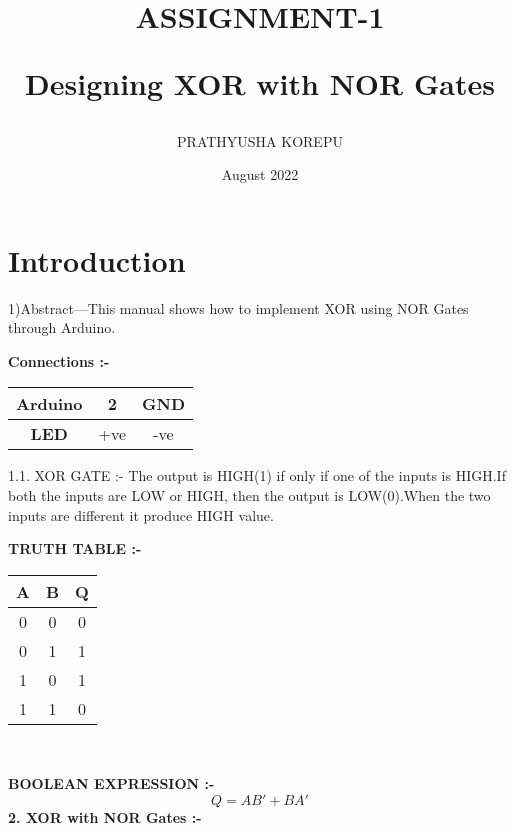 \documentclass{article}
\title{ASSIGNMENT-1  

Designing XOR with NOR Gates}
\author{PRATHYUSHA KOREPU}
\date{August 2022}
\begin{document}
\maketitle

\section{Introduction}

1)Abstract—This manual shows how to  implement XOR using NOR Gates through Arduino.
\vspace{5MM}

\textbf{Connections :-}
\begin{tabular}{|c|c|c|}

\hline
\textbf{Arduino} & {2} & {GND} \\
\hline
\textbf{LED} & {+ve} & {-ve} \\
\hline
\end{tabular}

\vspace{5MM}
1.1. {XOR GATE :-}
The output is HIGH(1) if only if one of the inputs is HIGH.If both the inputs are LOW or HIGH, then the output is LOW(0).When the two inputs are different it produce HIGH value.
\vspace{5MM}

\textbf{TRUTH TABLE :-}
\vspace{5MM}
\newline

\begin{tabular}{|c|c|c|}
\hline
\textbf{A} & {B} & {Q} \\
\hline
0 & 0 & 0 \\
\hline
0 & 1 & 1 \\
\hline
1 & 0 & 1 \\
\hline
1 & 1 & 0 \\
\hline


\end{tabular}
\vspace{3mm}
\\
\vspace{5MM}
\newline

\textbf{BOOLEAN EXPRESSION :-}
\vspace{5MM}
\newline
\begin{equation}
    Q = AB' + BA'
\end{equation}
\textbf{2. XOR with NOR Gates :-}
\end{document}
